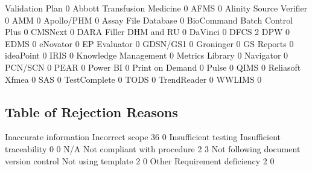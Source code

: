 \documentclass{article}
\begin{document}
\begin{Schunk}
\begin{Soutput}
                                Validation Plan
                                              0
  Abbott Transfusion Medicine                 0
  AFMS                                        0
  Alinity Source Verifier                     0
  AMM                                         0
  Apollo/PHM                                  0
  Assay File Database                         0
  BioCommand Batch Control Plus               0
  CMSNext                                     0
  DARA Filler DHM and RU                      0
  DaVinci                                     0
  DFCS                                        2
  DPW                                         0
  EDMS                                        0
  eNovator                                    0
  EP Evaluator                                0
  GDSN/GS1                                    0
  Groninger                                   0
  GS Reports                                  0
  ideaPoint                                   0
  IRIS                                        0
  Knowledge Management                        0
  Metrics Library                             0
  Navigator                                   0
  PCN/SCN                                     0
  PEAR                                        0
  Power BI                                    0
  Print on Demand                             0
  Pulse                                       0
  QIMS                                        0
  Reliasoft Xfmea                             0
  SAS                                         0
  TestComplete                                0
  TODS                                        0
  TrendReader                                 0
  WWLIMS                                      0
\end{Soutput}
\end{Schunk}

\subsection{Table of Rejection Reasons}
\begin{Schunk}
\begin{Soutput}
                Inaccurate information                        Incorrect scope 
                                    36                                      0 
                  Insufficient testing              Insufficient traceability 
                                     0                                      0 
                                   N/A           Not compliant with procedure 
                                     2                                      3 
Not following document version control                     Not using template 
                                     2                                      0 
                                 Other                 Requirement deficiency 
                                     2                                      0 
\end{Soutput}
\end{Schunk}
\end{document}
